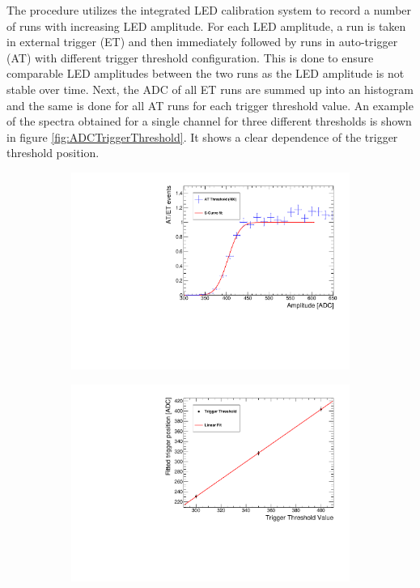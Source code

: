 The procedure utilizes the integrated LED calibration system to record a number of runs with increasing LED amplitude. For each LED amplitude, a run is taken in external trigger (ET) and then immediately followed by runs in auto-trigger (AT) with different trigger threshold configuration. This is done to ensure comparable LED amplitudes between the two runs as the LED amplitude is not stable over time. Next, the ADC of all ET runs are summed up into an histogram and the same is done for all AT runs for each trigger threshold value. An example of the spectra obtained for a single channel for three different thresholds is shown in figure \ref{fig:ADCTriggerThreshold}. It shows a clear dependence of the trigger threshold position.
\begin{figure}[htbp!]
  \centering
  \begin{subfigure}[t]{0.49\textwidth}
    \includegraphics[width=1.\linewidth]{../Thesis_Plots/Commissioning/Plots/EfficiencyCurveFit_HBU2_12.pdf}
    \caption{} \label{fig:EffiCurve}
  \end{subfigure}
  \hfill
  \begin{subfigure}[t]{0.49\textwidth}
    \includegraphics[width=1.\linewidth]{../Thesis_Plots/Commissioning/Plots/TriggerThresholdFit_HBU2_12.pdf}

\end{subfigure}
\end{figure}
